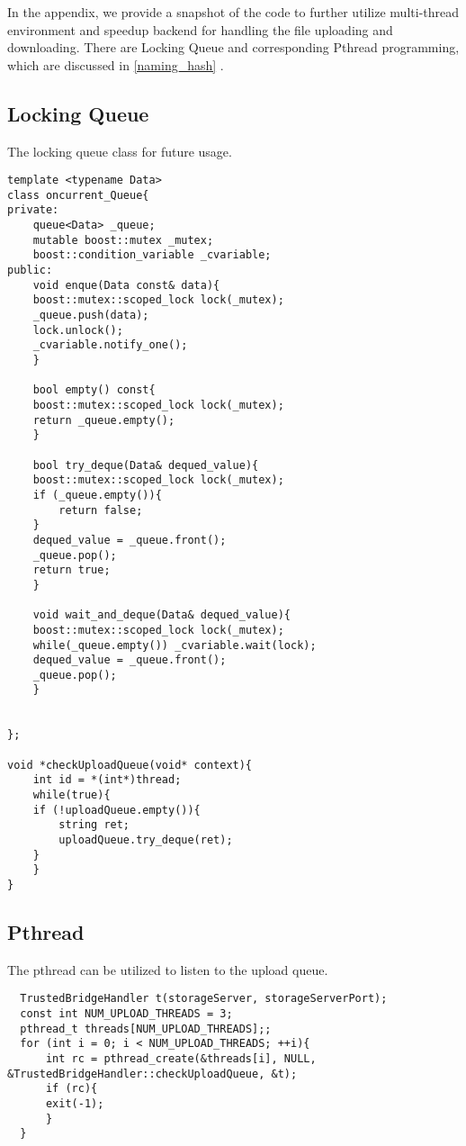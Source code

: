 
In the appendix, we provide a snapshot of the code to further utilize
multi-thread environment and speedup backend for handling the file uploading and downloading.
There are Locking Queue and corresponding Pthread programming, which are discussed in
\ref{naming_hash}
.


\subsection{Locking Queue}
The locking queue class for future usage. 

\begin{lstlisting}
template <typename Data>
class oncurrent_Queue{
private:
    queue<Data> _queue;
    mutable boost::mutex _mutex;
    boost::condition_variable _cvariable;
public:
    void enque(Data const& data){
	boost::mutex::scoped_lock lock(_mutex);
	_queue.push(data);
	lock.unlock();
	_cvariable.notify_one();    
    }

    bool empty() const{
	boost::mutex::scoped_lock lock(_mutex);
	return _queue.empty();    
    }

    bool try_deque(Data& dequed_value){
	boost::mutex::scoped_lock lock(_mutex);
	if (_queue.empty()){
	    return false;
	}    
	dequed_value = _queue.front();
	_queue.pop();
	return true;
    }

    void wait_and_deque(Data& dequed_value){
	boost::mutex::scoped_lock lock(_mutex);
	while(_queue.empty()) _cvariable.wait(lock);
	dequed_value = _queue.front();
	_queue.pop();    
    }


};

void *checkUploadQueue(void* context){
    int id = *(int*)thread;
    while(true){
	if (!uploadQueue.empty()){               
	    string ret;
	    uploadQueue.try_deque(ret);
	}
    }
}
\end{lstlisting}

\subsection{Pthread}

The pthread can be utilized to 
listen to the upload queue.

\begin{lstlisting}
  TrustedBridgeHandler t(storageServer, storageServerPort);
  const int NUM_UPLOAD_THREADS = 3;
  pthread_t threads[NUM_UPLOAD_THREADS];;
  for (int i = 0; i < NUM_UPLOAD_THREADS; ++i){ 
      int rc = pthread_create(&threads[i], NULL, &TrustedBridgeHandler::checkUploadQueue, &t);
      if (rc){
	  exit(-1);    
      }    
  }
\end{lstlisting}


